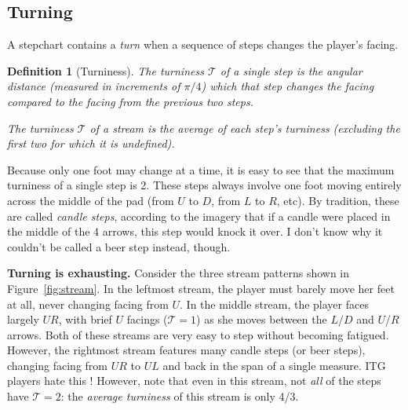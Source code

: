 \documentclass[10pt]{sigplanconf}
\begin{document}
\subsection{Turning}

A stepchart contains a {\em turn} when a sequence of steps changes the player's facing.

\newtheorem{definition}{Definition}
\begin{definition}[Turniness]
	The turniness $\mathcal{T}$ of a single step is the angular distance (measured in increments of $\pi/4$) which that step changes the facing compared to the facing from the previous two steps.

	The turniness $\mathcal{T}$ of a stream is the average of each step's turniness (excluding the first two for which it is undefined).
\end{definition}

Because only one foot may change at a time, it is easy to see that the maximum turniness of a single step is 2.
These steps always involve one foot moving entirely across the middle of the pad (from $U$ to $D$, from $L$ to $R$, etc).
By tradition, these are called {\em candle steps}, according to the imagery that if a candle were placed in the middle of the 4 arrows, this step would knock it over. I don't know why it couldn't be called a beer step instead, though.

{\bf Turning is exhausting.} Consider the three stream patterns shown in Figure~\ref{fig:stream}.
In the leftmost stream, the player must barely move her feet at all, never changing facing from $U$.
In the middle stream, the player faces largely $UR$, with brief $U$ facings ($\mathcal{T}=1$) as she moves between the $L$/$D$ and $U$/$R$ arrows.
Both of these streams are very easy to step without becoming fatigued.
However, the rightmost stream features many candle steps (or beer steps), changing facing from $UR$ to $UL$ and back in the span of a single measure.
ITG players hate this \cite{weirdtrick}!
However, note that even in this stream, not {\em all} of the steps have $\mathcal{T}=2$: the {\em average turniness} of this stream is only 4/3.
\end{document}
